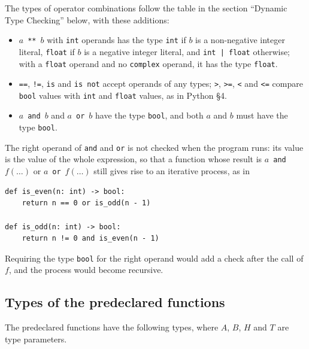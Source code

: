 The types of operator combinations follow the table in the section ``Dynamic Type
Checking'' below, with these additions:
\begin{itemize}
  \item $a$~\texttt{**}~$b$ with \texttt{int} operands has the type \texttt{int} if $b$ is a
    non-negative integer literal, \texttt{float} if $b$ is a negative integer literal, and
    \texttt{int~|~float} otherwise; with a \texttt{float} operand and no \texttt{complex}
    operand, it has the type \texttt{float}.
  \item \texttt{==}, \texttt{!=}, \texttt{is} and \texttt{is not} accept operands of any
    types; \texttt{>}, \texttt{>=}, \texttt{<} and \texttt{<=} compare \texttt{bool} values with
    \texttt{int} and \texttt{float} values, as in Python \S 4.
  \item $a$~\texttt{and}~$b$ and $a$~\texttt{or}~$b$ have the type \texttt{bool}, and both $a$ and $b$
    must have the type \texttt{bool}.
\end{itemize}
The right operand of \texttt{and} and \texttt{or} is not checked when the program runs: its value is
the value of the whole expression, so that a function whose result is $a$~\texttt{and}~$f(\ldots)$ or
$a$~\texttt{or}~$f(\ldots)$ still gives rise to an iterative process, as in
\begin{lstlisting}
def is_even(n: int) -> bool:
    return n == 0 or is_odd(n - 1)

def is_odd(n: int) -> bool:
    return n != 0 and is_even(n - 1)
\end{lstlisting}
Requiring the type \texttt{bool} for the right operand would add a check after the call of
$f$, and the process would become recursive.

\subsection*{Types of the predeclared functions}

The predeclared functions have the following types, where $A$, $B$, $H$ and $T$ are type
parameters.

